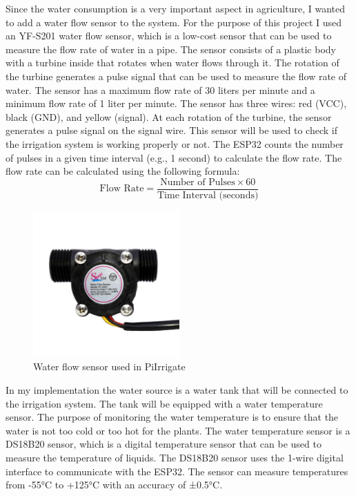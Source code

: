 Since the water consumption is a very important aspect in agriculture, 
I wanted to add a water flow sensor to the system. For the purpose of this project I used an 
YF-S201 water flow sensor, which is a low-cost sensor that can be used to measure the flow rate of water in a pipe.
The sensor consists of a plastic body with a 
turbine inside that rotates when water flows through it.
The rotation of the turbine generates a pulse signal that can be used to measure the 
flow rate of water.
The sensor has a maximum flow rate of 30 liters per minute and a minimum 
flow rate of 1 liter per minute.
The sensor has three wires: red (VCC), black (GND), and yellow (signal).
At each rotation of the turbine, the sensor generates a pulse signal on the signal wire.
This sensor will be used to check if the irrigation system is working properly or not.
The ESP32 counts the number of pulses in a given time interval 
(e.g., 1 second) to calculate the flow rate.
The flow rate can be calculated using the following formula:
\begin{equation}
    \text{Flow Rate} = \frac{\text{Number of Pulses} \times 60}{\text{Time Interval (seconds)}}
\end{equation}
\begin{figure}[H]
    \centering
    \includegraphics[width=0.5\textwidth]{images/water-flow.jpg}
    \caption{Water flow sensor used in PiIrrigate}
    \label{fig:water-flow-sensor}
\end{figure}

In my implementation the water source is a water tank that will be connected to the irrigation system.
The tank will be equipped with a water temperature sensor. The purpose
of monitoring the water temperature is to ensure that the water is not too cold or too hot for the plants.
The water temperature sensor is a DS18B20 sensor, which is a digital temperature sensor that can be used to measure the temperature of liquids.
The DS18B20 sensor uses the 1-wire digital interface to communicate with the ESP32.
The sensor can measure temperatures from -55°C to +125°C with an accuracy of ±0.5°C.

